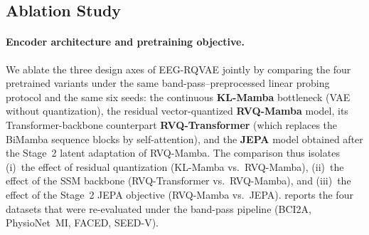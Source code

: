\documentclass{article}
\begin{document}
\subsection{Ablation Study}

\paragraph{Encoder architecture and pretraining objective.}
We ablate the three design axes of EEG-RQVAE jointly by comparing the four
pretrained variants under the same band-pass--preprocessed linear probing
protocol and the same six seeds: the continuous \textbf{KL-Mamba} bottleneck
(VAE without quantization), the residual vector-quantized \textbf{RVQ-Mamba}
model, its Transformer-backbone counterpart \textbf{RVQ-Transformer} (which
replaces the BiMamba sequence blocks by self-attention), and the
\textbf{JEPA} model obtained after the Stage~2 latent adaptation of RVQ-Mamba.
The comparison thus isolates (i)~the effect of residual quantization
(KL-Mamba vs.\ RVQ-Mamba), (ii)~the effect of the SSM backbone
(RVQ-Transformer vs.\ RVQ-Mamba), and (iii)~the effect of the Stage~2 JEPA
objective (RVQ-Mamba vs.\ JEPA).  reports the four
datasets that were re-evaluated under the band-pass pipeline (BCI2A,
PhysioNet~MI, FACED, SEED-V).
\end{document}
